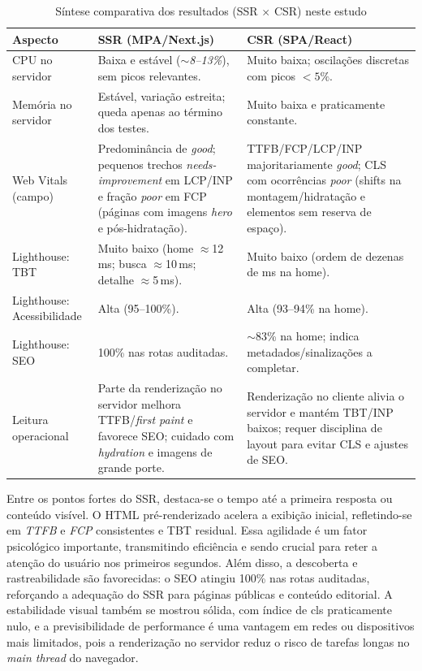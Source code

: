 {\begin{table}[H]
\centering
\caption{Síntese comparativa dos resultados (SSR $\times$ CSR) neste estudo}
\label{tab:comparativo-ssr-csr}
\begin{tabular}{|p{4.2cm}|p{5.2cm}|p{5.2cm}|}
\hline
Aspecto & SSR (MPA/Next.js) & CSR (SPA/React) \\
\hline
CPU no servidor & Baixa e estável (\textit{$\sim$8--13\%}), sem picos relevantes. & Muito baixa; oscilações discretas com picos $<5\%$. \\
\hline
Memória no servidor & Estável, variação estreita; queda apenas ao término dos testes. & Muito baixa e praticamente constante. \\
\hline
Web Vitals (campo) & Predominância de \textit{good}; pequenos trechos \textit{needs-improvement} em LCP/INP e fração \textit{poor} em FCP (páginas com imagens \emph{hero} e pós-hidratação). & TTFB/FCP/LCP/INP majoritariamente \textit{good}; CLS com ocorrências \textit{poor} (shifts na montagem/hidratação e elementos sem reserva de espaço). \\
\hline
Lighthouse: TBT & Muito baixo (home $\approx$12\,ms; busca $\approx$10\,ms; detalhe $\approx$5\,ms). & Muito baixo (ordem de dezenas de ms na home). \\
\hline
Lighthouse: Acessibilidade & Alta (95--100\%). & Alta (93--94\% na home). \\
\hline
Lighthouse: SEO & 100\% nas rotas auditadas. & $\sim$83\% na home; indica metadados/sinalizações a completar. \\
\hline
Leitura operacional & Parte da renderização no servidor melhora TTFB/\emph{first paint} e favorece SEO; cuidado com \emph{hydration} e imagens de grande porte. & Renderização no cliente alivia o servidor e mantém TBT/INP baixos; requer disciplina de layout para evitar CLS e ajustes de SEO. \\
\hline
\end{tabular}
\end{table}

Entre os pontos fortes do SSR, destaca-se o tempo até a primeira resposta ou conteúdo visível. O HTML pré-renderizado acelera a exibição inicial, refletindo-se em \textit{TTFB} e \textit{FCP} consistentes e TBT residual. Essa agilidade é um fator psicológico importante, transmitindo eficiência e sendo crucial para reter a atenção do usuário nos primeiros segundos. Além disso, a descoberta e rastreabilidade são favorecidas: o SEO atingiu 100\% nas rotas auditadas, reforçando a adequação do SSR para páginas públicas e conteúdo editorial. A estabilidade visual também se mostrou sólida, com índice de \acrshort{cls} praticamente nulo, e a previsibilidade de performance é uma vantagem em redes ou dispositivos mais limitados, pois a renderização no servidor reduz o risco de tarefas longas no \emph{main thread} do navegador.

}
